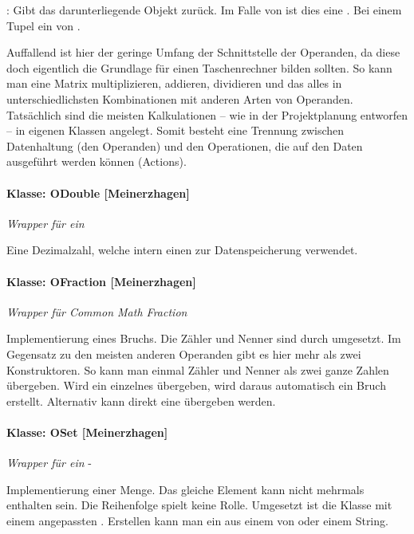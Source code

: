 : Gibt das darunterliegende Objekt zurück. Im Falle von  ist dies eine . Bei einem Tupel ein  von .

Auffallend ist hier der geringe Umfang der Schnittstelle der Operanden, da diese doch eigentlich die Grundlage für einen Taschenrechner bilden sollten. So kann man eine Matrix multiplizieren, addieren, dividieren und das alles in unterschiedlichsten Kombinationen mit anderen Arten von Operanden. Tatsächlich sind die meisten Kalkulationen – wie in der Projektplanung entworfen – in eigenen Klassen angelegt. Somit besteht eine Trennung zwischen Datenhaltung (den Operanden) und den Operationen, die auf den Daten ausgeführt werden können (Actions).

\paragraph{Klasse: ODouble [Meinerzhagen]}

\textit{Wrapper für ein} 

Eine Dezimalzahl, welche intern einen  zur Datenspeicherung verwendet.


\paragraph{Klasse: OFraction [Meinerzhagen]}

\textit{Wrapper für Common Math Fraction}

Implementierung eines Bruchs. Die Zähler und Nenner sind durch  umgesetzt. Im Gegensatz zu den meisten anderen Operanden gibt es hier mehr als zwei Konstruktoren. So kann man einmal Zähler und Nenner als zwei ganze Zahlen übergeben. Wird ein einzelnes  übergeben, wird daraus automatisch ein Bruch erstellt. Alternativ kann direkt eine  übergeben werden.

\paragraph{Klasse: OSet [Meinerzhagen]}

\textit{Wrapper für ein} -

Implementierung einer Menge. Das gleiche Element kann nicht mehrmals enthalten sein. Die Reihenfolge spielt keine Rolle. Umgesetzt ist die Klasse mit einem angepassten . Erstellen kann man ein  aus einem  von  oder einem String.

